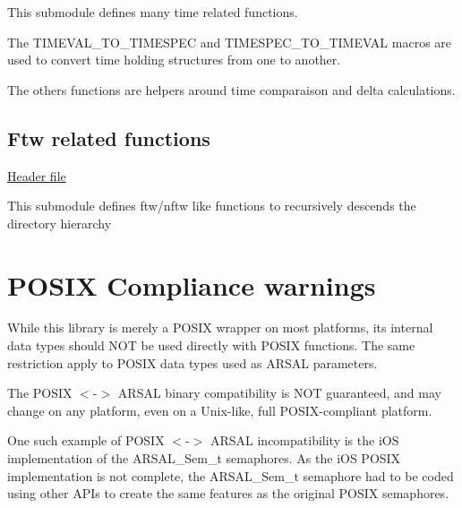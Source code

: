 This submodule defines many time related functions.

The T\+I\+M\+E\+V\+A\+L\+\_\+\+T\+O\+\_\+\+T\+I\+M\+E\+S\+P\+EC and T\+I\+M\+E\+S\+P\+E\+C\+\_\+\+T\+O\+\_\+\+T\+I\+M\+E\+V\+AL macros are used to convert time holding structures from one to another.

The others functions are helpers around time comparaison and delta calculations.\hypertarget{index_SAL_ftw_subsec}{}\subsection{Ftw related functions}\label{index_SAL_ftw_subsec}
\hyperlink{}{Header file }

This submodule defines ftw/nftw like functions to recursively descends the directory hierarchy\hypertarget{index_SAL_posix_sec}{}\section{P\+O\+S\+I\+X Compliance warnings}\label{index_SAL_posix_sec}
While this library is merely a P\+O\+S\+IX wrapper on most platforms, its internal data types should N\+OT be used directly with P\+O\+S\+IX functions. The same restriction apply to P\+O\+S\+IX data types used as A\+R\+S\+AL parameters.

The P\+O\+S\+IX $<$-\/$>$ A\+R\+S\+AL binary compatibility is N\+OT guaranteed, and may change on any platform, even on a Unix-\/like, full P\+O\+S\+I\+X-\/compliant platform.

One such example of P\+O\+S\+IX $<$-\/$>$ A\+R\+S\+AL incompatibility is the i\+OS implementation of the A\+R\+S\+A\+L\+\_\+\+Sem\+\_\+t semaphores. As the i\+OS P\+O\+S\+IX implementation is not complete, the A\+R\+S\+A\+L\+\_\+\+Sem\+\_\+t semaphore had to be coded using other A\+P\+Is to create the same features as the original P\+O\+S\+IX semaphores. 